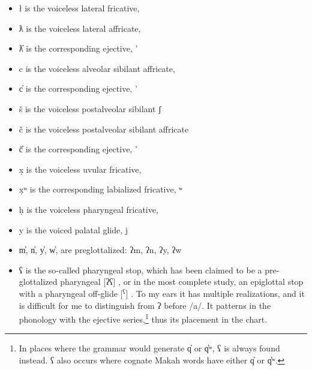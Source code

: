 \begin{itemize}
	\item ł is the voiceless lateral fricative, \textbeltl
	\item ƛ is the voiceless lateral affricate, 
	\item ƛ̓ is the corresponding ejective, '
	\item c is the voiceless alveolar sibilant affricate, 
	\item c̓ is the corresponding ejective, '
	\item š is the voiceless postalveolar sibilant ʃ
	\item č is the voiceless postalveolar sibilant affricate 
	\item č̓ is the corresponding ejective, '
	\item x̣ is the voiceless uvular fricative, \textchi
	\item x̣ʷ is the corresponding labialized fricative, {\textchi}ʷ
	\item ḥ is the voiceless pharyngeal fricative, {\textcrh}
	\item y is the voiced palatal glide, j
	\item m̓, n̓, y̓, w̓, are preglottalized: ʔm, ʔn, ʔy, ʔw
	\item ʕ is the so-called pharyngeal stop, which has been claimed to be a pre-glottalized pharyngeal [ʔʕ] \citep{shank2000}, or in the most complete study, an epiglottal stop with a pharyngeal off-glide [\textbarglotstop$^{\text{ʕ}}$] \citep{carlson2001, esling2005}. To my ears it has multiple realizations, and it is difficult for me to distinguish from ʔ before /a/. It patterns in the phonology with the ejective series,\footnote{In places where the grammar would generate q̓ or q̓ʷ, ʕ is always found instead. ʕ also occurs where cognate Makah words have either q̓ or q̓ʷ.} thus its placement in the chart.
\end{itemize}